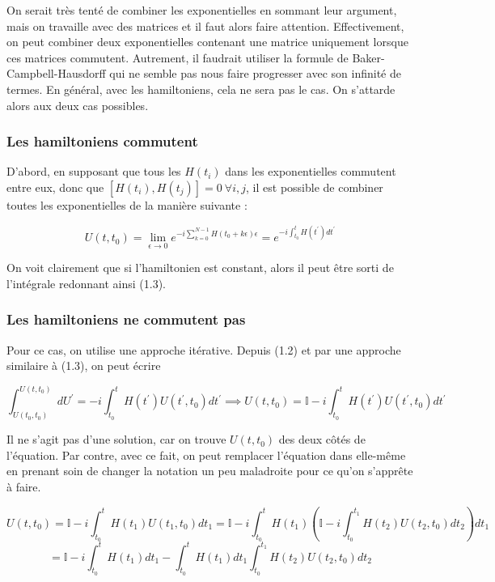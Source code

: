 On serait très tenté de combiner les exponentielles en sommant leur argument, mais on travaille avec des matrices et il faut alors faire attention. Effectivement, on peut combiner deux exponentielles contenant une matrice uniquement lorsque ces matrices commutent. Autrement, il faudrait utiliser la formule de Baker-Campbell-Hausdorff qui ne semble pas nous faire progresser avec son infinité de termes. En général, avec les hamiltoniens, cela ne sera pas le cas. On s'attarde alors aux deux cas possibles.

\subsubsection{Les hamiltoniens commutent}

D'abord, en supposant que tous les $H(t_i)$ dans les exponentielles commutent entre eux, donc que $\left[H(t_i), H(t_j)\right] = 0 \ \forall i,j$, il est possible de combiner toutes les exponentielles de la manière suivante :

\begin{equation}
    U(t,t_0) = \lim_{\epsilon \rightarrow 0} e^{-i \sum_{k=0}^{N-1}H(t_0 + k\epsilon)\epsilon} = e^{-i\int_{t_0}^{t}H(t^{'})dt^{'}}
\end{equation}

On voit clairement que si l'hamiltonien est constant, alors il peut être sorti de l'intégrale redonnant ainsi (1.3).

\subsubsection{Les hamiltoniens ne commutent pas}
Pour ce cas, on utilise une approche itérative. Depuis (1.2) et par une approche similaire à (1.3), on peut écrire 

\begin{equation*}
    \int_{U(t_0,t_0)}^{U(t,t_0)}dU^{'} = -i \int_{t_0}^{t}H(t^{'})U(t^{'}, t_0)dt^{'} \implies U(t,t_0) = \mathbb{I} -i\int_{t_0}^{t}H(t^{'})U(t^{'},t_0)dt^{'}
\end{equation*}

Il ne s'agit pas d'une solution, car on trouve $U(t,t_0)$ des deux côtés de l'équation. Par contre, avec ce fait, on peut remplacer l'équation dans elle-même en prenant soin de changer la notation un peu maladroite pour ce qu'on s'apprête à faire.

\begin{equation*}
    U(t,t_0) = \mathbb{I} -i\int_{t_0}^{t}H(t_1)U(t_1,t_0)dt_1 = \mathbb{I} -i\int_{t_0}^{t}H(t_1)\left(\mathbb{I} - i\int_{t_0}^{t_1}H(t_2)U(t_2,t_0)dt_2\right)dt_1
\end{equation*}
\begin{equation*}
    = \mathbb{I} -i\int_{t_0}^{t}H(t_1)dt_1 - \int_{t_0}^{t}H(t_1)dt_1\int_{t_0}^{t_1}H(t_2)U(t_2,t_0)dt_2
\end{equation*}

